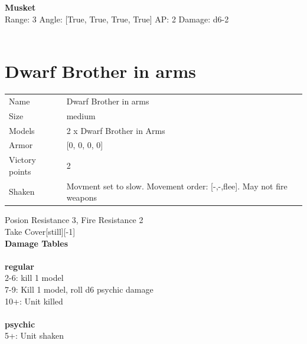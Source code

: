 \ \\

\ \\
{\bf Musket } \\



Range: 3  Angle: [True, True, True, True] AP: 2 Damage: d6-2 \\




 
\ \\














\clearpage

\section{ Dwarf Brother in arms }

\begin{tabular}{ll}
  Name & Dwarf Brother in arms \\
  Size & medium\\
  Models & 2 x Dwarf Brother in Arms\\
  Armor & [0, 0, 0, 0]\\
  Victory points & 2\\
  Shaken & Movment set to slow. Movement order: [-,-,flee]. May not fire weapons\\
\end{tabular}

Posion Resistance 3, Fire Resistance 2\\ 
Take Cover[still][-1]\\ 



{\bf Damage Tables} \\
\ \\ {\bf regular } \\
2-6: kill 1 model \\
7-9: Kill 1 model, roll d6 psychic damage \\
10+: Unit killed \\
\ \\ {\bf psychic } \\
5+: Unit shaken \\


\clearpage

